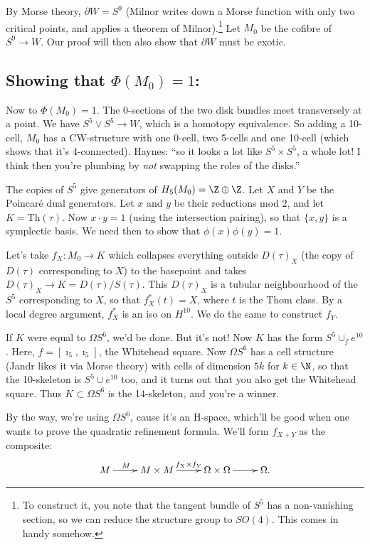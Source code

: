 \documentclass[11pt]{article}
\begin{document}
\begin{JandrKervaire}
By Morse theory, $\partial W=S^9$ (Milnor writes down a Morse function with only two critical points, and applies a theorem of Milnor).\footnote{To construct it, you note that the tangent bundle of $S^5$ has a non-vanishing section, so we can reduce the structure group to $SO(4)$. This comes in handy somehow.} 
Let $M_0$ be the cofibre of $S^9\to W$. Our proof will then also show that $\partial W$ must be exotic.

\subsection*{Showing that $\Phi(M_0)=1$:}
Now to $\Phi(M_0)=1$. The 0-sections of the two disk bundles meet transversely at a point. We have $S^5\vee S^5\to W$, which is a homotopy equivalence. So adding a 10-cell, $M_0$ has a CW-structure with one 0-cell, two 5-cells and one 10-cell (which shows that it's 4-connected). Haynes: ``so it looks a lot like $S^5\times S^5$, a whole lot! I think then you're plumbing by \emph{not} swapping the roles of the disks.''

The copies of $S^5$ give generators of $H_5(M_0)=\Z\oplus\Z$. Let $X$ and $Y$ be the Poincar\'e dual generators. Let $x$ and $y$ be their reductions mod $2$, and let $K=\text{Th}(\tau)$. Now $x\cdot y=1$ (using the intersection pairing), so that $\{x,y\}$ is a symplectic basis. We need then to show that $\phi(x)\phi(y)=1$.

Let's take $f_X:M_0\to K$ which collapses everything outside $D(\tau)_X$ (the copy of $D(\tau)$ corresponding to $X$) to the basepoint and takes $D(\tau)_X\to K=D(\tau)/S(\tau)$. This $D(\tau)_X$ is a tubular neighbourhood of the $S^5$ corresponding to $X$, so that $f_X^*(t)=X$, where $t$ is the Thom class. By a local degree argument, $f_X^*$ is an iso on $H^{10}$. We do the same to construct $f_Y$.

If $K$ were equal to $\Omega S^6$, we'd be done. But it's not! Now $K$ has the form $S^5\cup_f e^{10}$. Here, $f=[\imath_5,\imath_5]$, the Whitehead square. Now $\Omega S^6$ has a cell structure (Jandr likes it via Morse theory) with cells of dimension $5k$ for $k\in\N$, so that the 10-skeleton is $S^5\cup e^{10}$ too, and it turns out that you also get the Whitehead square. Thus $K\subset \Omega S^6$ is the 14-skeleton, and you're a winner. 

By the way, we're using $\Omega S^6$, cause it's an H-space, which'll be good when one wants to prove the quadratic refinement formula. We'll form $f_{X+Y}$ as the composite:
\[\xymatrix{
M\ar[r]^{M\quad}&M\times M\ar[r]^{\ f_X\times f_Y}&\Omega\times\Omega\ar[r]&\Omega.
}\]

\end{JandrKervaire}
\end{document}
